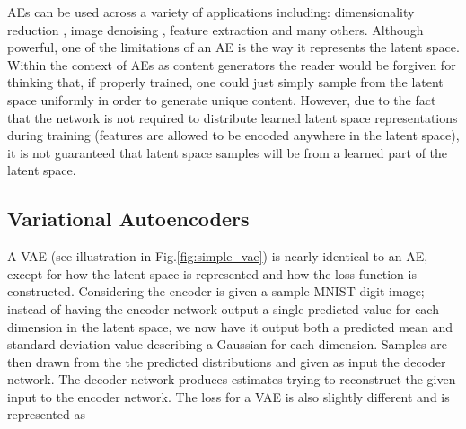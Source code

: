 \ac{AE}s can be used across a variety of applications including: 
dimensionality reduction \cite{6910027}, image denoising \cite{NISHIO2017e00393},
feature extraction \cite{7965877} and many others. Although powerful, 
one of the limitations of an \ac{AE} is the way it represents the 
latent space. Within the context of \ac{AE}s as content generators 
the reader would be forgiven for thinking that, if properly trained, 
one could just simply sample from the latent space uniformly 
in order to generate unique content. However, due to the fact 
that the network is not required to distribute learned latent 
space representations during training (features are allowed 
to be encoded anywhere in the latent space), it is not 
guaranteed that latent space samples will be from a 
learned part of the latent space.

%
%
\subsection{Variational Autoencoders}

A \ac{VAE} (see illustration in 
Fig.\ref{fig:simple_vae}) is nearly identical to an \ac{AE}, except for 
 how the latent space 
is represented and how the loss function is constructed. 
Considering the encoder is given 
a sample MNIST digit image; instead of having the encoder network 
output a single predicted value for each dimension in the 
latent space, we now have it output both a predicted 
mean and standard deviation value describing a Gaussian 
for each dimension. Samples are then drawn from the the 
predicted distributions and given as input the decoder network. 
The decoder network produces estimates trying to reconstruct 
the given input to the encoder network. The loss for 
a \ac{VAE} is also slightly different and is represented 
as 

